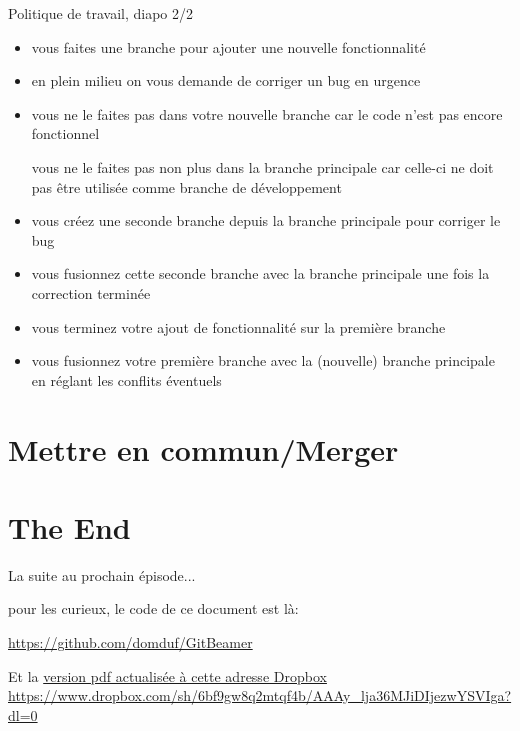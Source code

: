 \documentclass[10pt]{beamer}
\begin{document}
\begin{frame}{Politique de travail, diapo 2/2}

\begin{itemize}
  \item vous faites une branche pour ajouter une nouvelle fonctionnalité
  
  \item  en plein milieu on vous demande de corriger un bug en urgence
  
   \item     vous ne le faites pas dans votre nouvelle branche car le code n'est pas encore fonctionnel
   
        vous ne le faites pas non plus dans la branche principale car celle-ci ne doit pas être utilisée comme branche de développement
        
  \item          vous créez une seconde branche depuis la branche principale pour corriger le bug
  
   \item         vous fusionnez cette seconde branche avec la branche principale une fois la correction terminée
  
  \item          vous terminez votre ajout de fonctionnalité sur la première branche
    
    \item        vous fusionnez votre première branche avec la (nouvelle) branche principale en réglant les conflits éventuels
\end{itemize}

 

\end{frame}

\section{Mettre en commun/Merger}


\section{The End}


\begin{frame}
La suite au prochain épisode...
 
pour les curieux, le code de ce document est là:

\href{https://github.com/domduf/GitBeamer}{https://github.com/domduf/GitBeamer}

Et la \href{https://www.dropbox.com/sh/6bf9gw8q2mtqf4b/AAAy_lja36MJiDIjezwYSVIga?dl=0}{version pdf actualisée à cette adresse Dropbox}
\url{https://www.dropbox.com/sh/6bf9gw8q2mtqf4b/AAAy_lja36MJiDIjezwYSVIga?dl=0}

\end{frame}
\end{document}
